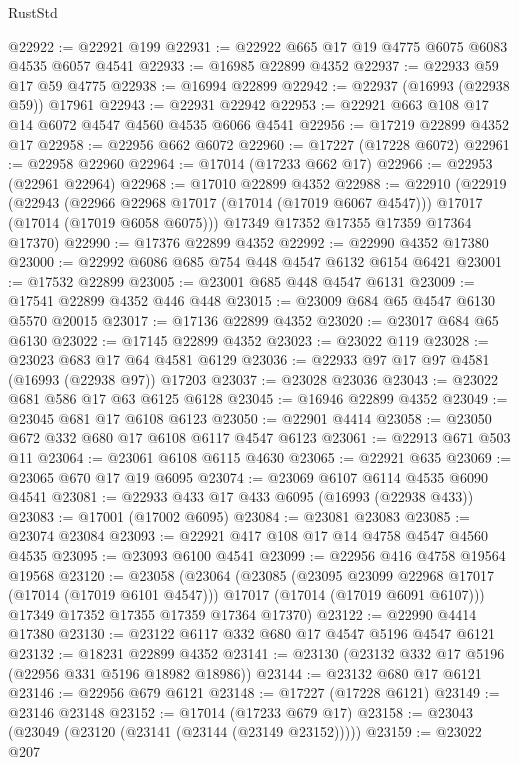 \begin{lexlean}{RustStd}
\begin{coremodule}
{\begin{coremodule}
{{{{{{{{{{{{{{{{{{{{{{{{{{{{{{{{{{{{{{{{{{{{{{{{{{{{{{{@22922 := @22921 @199
@22931 := @22922 @665 @17 @19 @4775 @6075 @6083 @4535 @6057 @4541
@22933 := @16985 @22899 @4352
@22937 := @22933 @59 @17 @59 @4775
@22938 := @16994 @22899
@22942 := @22937 (@16993 (@22938 @59)) @17961
@22943 := @22931 @22942
@22953 := @22921 @663 @108 @17 @14 @6072 @4547 @4560 @4535 @6066 @4541
@22956 := @17219 @22899 @4352 @17
@22958 := @22956 @662 @6072
@22960 := @17227 (@17228 @6072)
@22961 := @22958 @22960
@22964 := @17014 (@17233 @662 @17)
@22966 := @22953 (@22961 @22964)
@22968 := @17010 @22899 @4352
@22988 := @22910
    (@22919
      (@22943
        (@22966 @22968 @17017 (@17014 (@17019 @6067 @4547)))
        @17017
        (@17014 (@17019 @6058 @6075)))
      @17349
      @17352
      @17355
      @17359
      @17364
      @17370)
@22990 := @17376 @22899 @4352
@22992 := @22990 @4352 @17380
@23000 := @22992 @6086 @685 @754 @448 @4547 @6132 @6154 @6421
@23001 := @17532 @22899
@23005 := @23001 @685 @448 @4547 @6131
@23009 := @17541 @22899 @4352 @446 @448
@23015 := @23009 @684 @65 @4547 @6130 @5570 @20015
@23017 := @17136 @22899 @4352
@23020 := @23017 @684 @65 @6130
@23022 := @17145 @22899 @4352
@23023 := @23022 @119
@23028 := @23023 @683 @17 @64 @4581 @6129
@23036 := @22933 @97 @17 @97 @4581 (@16993 (@22938 @97)) @17203
@23037 := @23028 @23036
@23043 := @23022 @681 @586 @17 @63 @6125 @6128
@23045 := @16946 @22899 @4352
@23049 := @23045 @681 @17 @6108 @6123
@23050 := @22901 @4414
@23058 := @23050 @672 @332 @680 @17 @6108 @6117 @4547 @6123
@23061 := @22913 @671 @503 @11
@23064 := @23061 @6108 @6115 @4630
@23065 := @22921 @635
@23069 := @23065 @670 @17 @19 @6095
@23074 := @23069 @6107 @6114 @4535 @6090 @4541
@23081 := @22933 @433 @17 @433 @6095 (@16993 (@22938 @433))
@23083 := @17001 (@17002 @6095)
@23084 := @23081 @23083
@23085 := @23074 @23084
@23093 := @22921 @417 @108 @17 @14 @4758 @4547 @4560 @4535
@23095 := @23093 @6100 @4541
@23099 := @22956 @416 @4758 @19564 @19568
@23120 := @23058
    (@23064
      (@23085
        (@23095 @23099 @22968 @17017 (@17014 (@17019 @6101 @4547)))
        @17017
        (@17014 (@17019 @6091 @6107)))
      @17349
      @17352
      @17355
      @17359
      @17364
      @17370)
@23122 := @22990 @4414 @17380
@23130 := @23122 @6117 @332 @680 @17 @4547 @5196 @4547 @6121
@23132 := @18231 @22899 @4352
@23141 := @23130 (@23132 @332 @17 @5196 (@22956 @331 @5196 @18982 @18986))
@23144 := @23132 @680 @17 @6121
@23146 := @22956 @679 @6121
@23148 := @17227 (@17228 @6121)
@23149 := @23146 @23148
@23152 := @17014 (@17233 @679 @17)
@23158 := @23043 (@23049 (@23120 (@23141 (@23144 (@23149 @23152)))))
@23159 := @23022 @207
}}}}}}}}}}}}}}}}}}}}}}}}}}}}}}}}}}}}}}}}}}}}}}}}}}}}}}}
\end{coremodule}}
\end{coremodule}
\end{lexlean}
